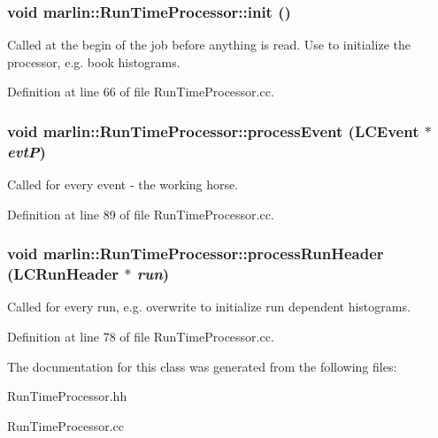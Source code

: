 \subsubsection[{init}]{\setlength{\rightskip}{0pt plus 5cm}void marlin::RunTimeProcessor::init ()}\label{classmarlin_1_1RunTimeProcessor_a864e65299205a751d64242464e61159c}


Called at the begin of the job before anything is read. Use to initialize the processor, e.g. book histograms. 

Definition at line 66 of file RunTimeProcessor.cc.
\subsubsection[{processEvent}]{\setlength{\rightskip}{0pt plus 5cm}void marlin::RunTimeProcessor::processEvent (LCEvent $\ast$ {\em evtP})}\label{classmarlin_1_1RunTimeProcessor_ab0ec7ef8923b3a6115658a69800aeb0f}


Called for every event -\/ the working horse. 

Definition at line 89 of file RunTimeProcessor.cc.
\subsubsection[{processRunHeader}]{\setlength{\rightskip}{0pt plus 5cm}void marlin::RunTimeProcessor::processRunHeader (LCRunHeader $\ast$ {\em run})}\label{classmarlin_1_1RunTimeProcessor_a7fe5dbba9ba3b2566bbfbf971acc3e7a}


Called for every run, e.g. overwrite to initialize run dependent histograms. 

Definition at line 78 of file RunTimeProcessor.cc.

The documentation for this class was generated from the following files:\begin{DoxyCompactItemize}
\item 
RunTimeProcessor.hh\item 
RunTimeProcessor.cc\end{DoxyCompactItemize}

